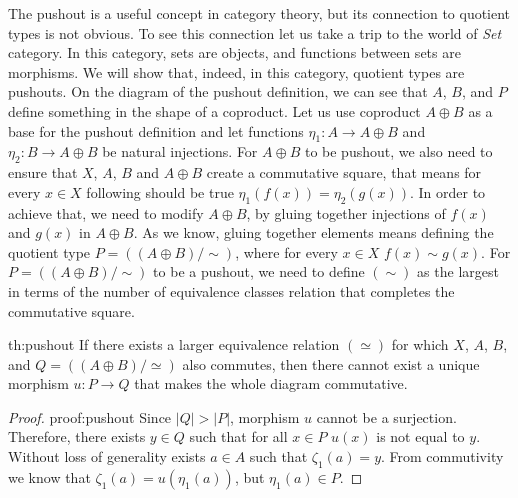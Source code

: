 The pushout is a useful concept in category theory, but its connection to quotient types is not obvious. To see this connection let us take a trip to the world of \emph{Set} category. In this category, sets are objects, and functions between sets are morphisms. We will show that, indeed, in this category, quotient types are pushouts. On the diagram of the pushout definition, we can see that $A$, $B$, and $P$ define something in the shape of a coproduct. Let us use coproduct $A \oplus B$ as a base for the pushout definition and let functions $\eta_1: A \rightarrow A \oplus B$ and $\eta_2: B \rightarrow A \oplus B$ be natural injections. For $A \oplus B$ to be pushout, we also need to ensure that $X$, $A$, $B$ and $A \oplus B$ create a commutative square, that means for every $x \in X$ following should be true $\eta_1(f(x)) = \eta_2(g(x))$. In order to achieve that, we need to modify $A \oplus B$, by gluing together injections of $f(x)$ and $g(x)$ in $A \oplus B$. As we know, gluing together elements means defining the quotient type $P = ((A \oplus B) / \sim)$, where for every $x \in X$ $f(x) \sim g(x)$. For $P = ((A \oplus B) / \sim)$ to be a pushout, we need to define $(\sim)$ as the largest in terms of the number of equivalence classes relation that completes the commutative square. 
\begin{theo}{}{th:pushout}
If there exists a larger equivalence relation $(\simeq)$ for which  $X$, $A$, $B$, and $Q = ((A \oplus B
)/\simeq)$ also commutes, then there cannot exist a unique morphism $u: P \rightarrow Q$ that makes the whole diagram commutative. 
\end{theo}

\begin{proof}{}{proof:pushout}
Since $|Q| > |P|$, morphism $u$ cannot be a surjection. Therefore,  there exists $y \in Q$ such that for all  $x \in P$ $u(x)$ is not equal to $y$. 
Without loss of generality exists $a \in A$ such that $\zeta_1(a) = y$. From commutivity we know that $\zeta_1(a) = u(\eta_1(a))$, but $\eta_1(a) \in P$. \contradiction
\end{proof}

